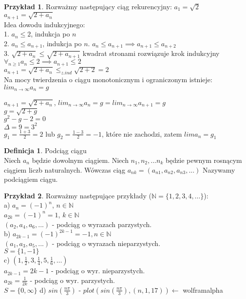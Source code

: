 \documentclass{article}
\theoremstyle{definition}
\newtheorem{de}{Definicja}[subsection]
\theoremstyle{definition}
\theoremstyle{definition}
\newtheorem{pk}{Przykład}[subsection]
\theoremstyle{definition}
\begin{document}
\begin{pk}
Rozważmy następujący ciąg rekurencyjny:
$a_1=\sqrt{2}$ $a_{n+1}=\sqrt{2+a_n}$\\
Idea dowodu indukcyjnego:\\
1. $a_n\leq 2$, indukcja po $n$\\
2. $a_n\leq a_{n+1}$, indukcja po $n$. $a_n\leq a_{n+1}\implies a_{n+1}\leq a_{n+2}$\\
3. $\sqrt{2+a_n}\leq \sqrt{2+a_{n+1}}$ kwadrat stronami rozwiązuje krok indukcyjny\\

$\forall_{n\geq 1} a_n \leq 2 \implies a_{n+1}\leq 2$\\
$a_{n+1}=\sqrt{2+a_n}\leq_{z. ind} \sqrt{2+2}=2$\\

Na mocy twierdzenia o ciągu monotonicznym i ograniczonym istnieje:\\
$lim_{n\rightarrow \infty} a_n = g$\\

\begin{center}
$a_{n+1}=\sqrt{2+a_n}$, $lim_{n\rightarrow \infty} a_n = g = lim_{n\rightarrow \infty} a_{n+1} = g$\\
$g=\sqrt{2+g}$\\
$g^2-g-2=0$\\
$\Delta=9=3^2$\\
$g_1=\frac{1+3}{2}=2$ lub $g_2=\frac{1-3}{2}=-1$, które nie zachodzi, zatem $lim a_n=g_1$
\end{center}
\end{pk}

\begin{de}
Podciąg ciągu\\
Niech $a_n$ będzie dowolnym ciągiem. Niech $n_1, n_2, ... n_k$ będzie pewnym rosnącym ciągiem liczb naturalnych.
Wówczas ciąg $a_{nk}=(a_{n1}, a_{n2}, a_{n3}, ...)$ Nazywamy podciągiem ciągu.
\end{de}

\begin{pk}
Rozważmy następujące przykłady ($\mathbb{N}=\{1,2,3,4,\dots\}$):\\
a) $a_n=(-1)^{n}$, $n\in\mathbb{N}$\\
$a_{2k}=(-1)^{n}=1$, $k\in\mathbb{N}$\\
$(a_2, a_4, a_6, ...)$ - podciąg o wyrazach parzystych.\\
b) $a_{2k-1}=(-1)^{2k-1}=-1, n\in\mathbb{N}$\\
$(a_1, a_3, a_5, ...)$ - podciąg o wyrazach nieparzystych.\\
$S=\{1,-1\}$\\
c) $(1, \frac{1}{2}, 3, \frac{1}{4}, 5, \frac{1}{6},\dots)$\\
$a_{2k-1}=2k-1$ - podciąg o wyr. nieparzystych.\\
$a_{2k}=\frac{1}{2k}$ - podciąg o wyr. parzystych.\\
$S=\{0, \infty\}$
d) $sin(\frac{n\pi}{3})$ - $plot(sin(\frac{n\pi}{3}),(n,1,17)) \leftarrow$ wolframalpha
\end{pk}
\end{document}
